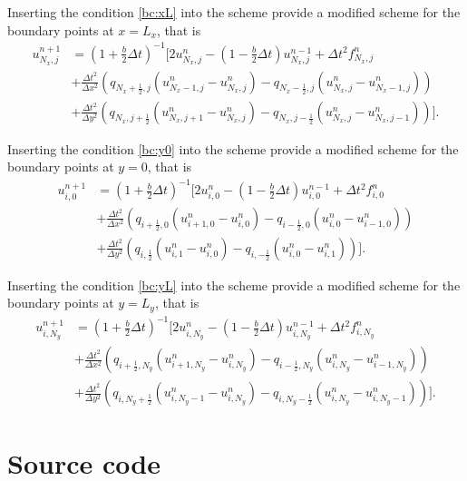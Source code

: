 \documentclass[twoside]{article}
\begin{document}
Inserting the condition \eqref{bc:xL} into the scheme provide a modified scheme for the boundary points at $x=L_x$, that is
\begin{align}
u_{N_x,j}^{n+1} &= (1+\frac{b}{2}\Delta t)^{-1} \bigg[2u_{N_x,j}^n - (1-\frac{b}{2}\Delta t) u_{N_x,j}^{n-1} + \Delta t^2 f_{N_x,j}^n \nonumber \\
&+ \frac{\Delta t^2}{\Delta x^2} \left(q_{N_x+\frac{1}{2},j} (u_{N_x-1,j}^n - u_{N_x,j}^n) -  q_{N_x-\frac{1}{2},j} (u_{N_x,j}^n - u_{N_x-1,j}^n) \right) \\
&+ \frac{\Delta t^2}{\Delta y^2} \left(q_{N_x,j+\frac{1}{2}} (u_{N_x,j+1}^n - u_{N_x,j}^n) -  q_{N_x,j-\frac{1}{2}} (u_{N_x,j}^n - u_{N_x,j-1}^n) \right) \bigg]. \nonumber
\end{align}

Inserting the condition \eqref{bc:y0} into the scheme provide a modified scheme for the boundary points at $y=0$, that is
\begin{align}
u_{i,0}^{n+1} &= (1+\frac{b}{2}\Delta t)^{-1} \bigg[2u_{i,0}^n - (1-\frac{b}{2}\Delta t) u_{i,0}^{n-1} + \Delta t^2 f_{i,0}^n \nonumber \\
&+ \frac{\Delta t^2}{\Delta x^2} \left(q_{i+\frac{1}{2},0} (u_{i+1,0}^n - u_{i,0}^n) -  q_{i-\frac{1}{2},0} (u_{i,0}^n - u_{i-1,0}^n) \right) \\
&+ \frac{\Delta t^2}{\Delta y^2} \left(q_{i,\frac{1}{2}} (u_{i,1}^n - u_{i,0}^n) -  q_{i,-\frac{1}{2}} (u_{i,0}^n - u_{i,1}^n) \right) \bigg]. \nonumber
\end{align}

Inserting the condition \eqref{bc:yL} into the scheme provide a modified scheme for the boundary points at $y=L_y$, that is
\begin{align}
u_{i,N_y}^{n+1} &= (1+\frac{b}{2}\Delta t)^{-1} \bigg[2u_{i,N_y}^n - (1-\frac{b}{2}\Delta t) u_{i,N_y}^{n-1} + \Delta t^2 f_{i,N_y}^n \nonumber \\
&+ \frac{\Delta t^2}{\Delta x^2} \left(q_{i+\frac{1}{2},N_y} (u_{i+1,N_y}^n - u_{i,N_y}^n) -  q_{i-\frac{1}{2},N_y} (u_{i,N_y}^n - u_{i-1,N_y}^n) \right) \\
&+ \frac{\Delta t^2}{\Delta y^2} \left(q_{i,N_y+\frac{1}{2}} (u_{i,N_y-1}^n - u_{i,N_y}^n) -  q_{i,N_y-\frac{1}{2}} (u_{i,N_y}^n - u_{i,N_y-1}^n) \right) \bigg]. \nonumber
\end{align}


\section{Source code}
\label{source:code}
\end{document}
